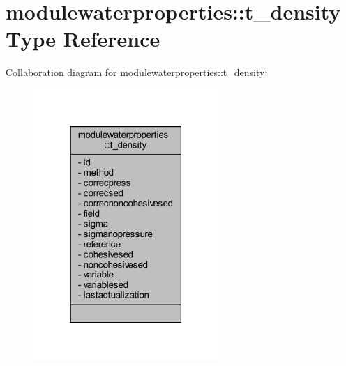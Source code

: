 \hypertarget{structmodulewaterproperties_1_1t__density}{}\section{modulewaterproperties\+:\+:t\+\_\+density Type Reference}
\label{structmodulewaterproperties_1_1t__density}


Collaboration diagram for modulewaterproperties\+:\+:t\+\_\+density\+:\nopagebreak
\begin{figure}[H]
\begin{center}
\leavevmode
\includegraphics[width=199pt]{structmodulewaterproperties_1_1t__density__coll__graph}
\end{center}
\end{figure}

